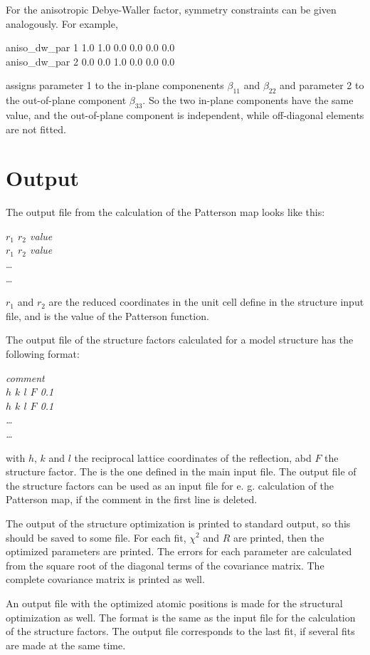 \documentclass[a4paper]{article}
\begin{document}
For the anisotropic Debye-Waller factor, symmetry constraints can be
given analogously. For example,
\begin{filestruc}
aniso\_dw\_par 1 1.0 1.0 0.0 0.0 0.0 0.0 \\
aniso\_dw\_par 2 0.0 0.0 1.0 0.0 0.0 0.0 
\end{filestruc}
assigns parameter 1 to the in-plane componenents $\beta_{11}$ and
$\beta_{22}$ and parameter 2 to the out-of-plane component
$\beta_{33}$. So the two in-plane components have the same value, and the
out-of-plane component is independent, while off-diagonal elements are
not fitted.



\section{Output}
The output file from the calculation of the Patterson map looks like this:
\begin{filestruc}
{\em $r_1$ $r_2$ value} \\
{\em $r_1$ $r_2$ value} \\
\ldots \\
\ldots \\
\end{filestruc}
$r_1$ and $r_2$ are the reduced coordinates in the unit cell define in the structure input file, and  is the value of the Patterson function.
 
The output file of the structure factors calculated for a model structure has the following format:
\begin{filestruc}
\em {comment \\
$h$ $k$ $l$ $F$ } 0.1 \\
{\em $h$ $k$ $l$ $F$ } 0.1 \\
\ldots \\
\ldots \\
\end{filestruc}
with $h$, $k$ and $l$  the reciprocal lattice coordinates of the reflection, abd $F$  the structure factor.
The  is the one defined in the main input file.
The output file of the structure factors can be used as an input file for e. g. calculation of the Patterson map, if the comment in the first line is deleted.

The output of the structure optimization is printed to standard output, so this should be saved to some file.
For each fit, $\chi^2$ and $R$ are printed, then the optimized parameters are printed. 
The errors for each parameter are calculated from the square root of the diagonal terms of the covariance matrix. 
The complete covariance matrix is printed as well.

An output file with the optimized atomic positions is made for the structural optimization as well. 
The format is the same as the input file for the calculation of the structure factors.
The output file corresponds to the last fit, if several fits are made at the same time.
\end{document}
